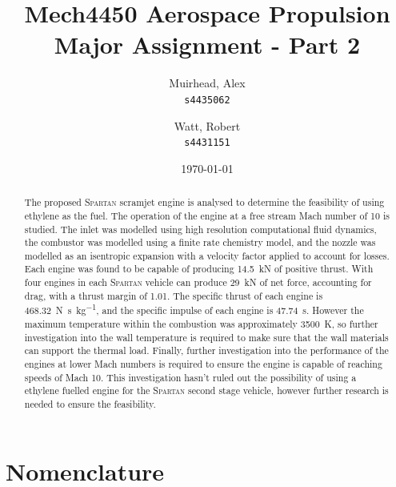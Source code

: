 \documentclass[a4paper]{article}
\title{
	\Large {\sc Mech}4450 Aerospace Propulsion \\
	\Huge Major Assignment - Part 2
}
\author{
	Muirhead, Alex \\ \texttt{s4435062}
	\and
	Watt, Robert \\ \texttt{s4431151}
}
\date{\today}
\begin{document}
\maketitle

\vfill

\begin{abstract}
    The proposed \textsc{Spartan} scramjet engine is analysed to determine the feasibility of using ethylene as the fuel. The operation of the engine at a free stream Mach number of 10 is studied. The inlet was modelled using high resolution computational fluid dynamics, the combustor was modelled using a finite rate chemistry model, and the nozzle was modelled as an isentropic expansion with a velocity factor applied to account for losses. Each engine was found to be capable of producing 14.5~kN of positive thrust. With four engines in each \textsc{Spartan} vehicle can produce 29~kN of net force, accounting for drag, with a thrust margin of 1.01. The specific thrust of each engine is \SI{468.32}{\N \s \per \kg}, and the specific impulse of each engine is \SI{47.74}{\s}. However the maximum temperature within the combustion was approximately 3500~K, so further investigation into the wall temperature is required to make sure that the wall materials can support the thermal load. Finally, further investigation into the performance of the engines at lower Mach numbers is required to ensure the engine is capable of reaching speeds of Mach 10. This investigation hasn't ruled out the possibility of using a ethylene fuelled engine for the \textsc{Spartan} second stage vehicle, however further research is needed to ensure the feasibility. 
\end{abstract}


\vspace{10em}

\newpage

\tableofcontents
\listoffigures
\listoftables
{}
\newpage
\section*{Nomenclature}
\end{document}
